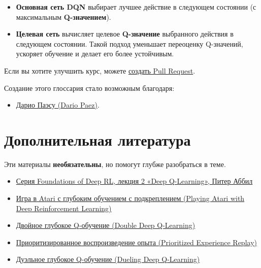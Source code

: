 \documentclass[11pt,a4paper]{article}
\begin{document}
\begin{itemize}
\begin{itemize}
    \begin{itemize}
    \tightlist
    \item
\textbf{Основная сеть DQN} выбирает лучшее действие в следующем состоянии (с максимальным \textbf{Q-значением}).
    \item
\textbf{Целевая сеть} вычисляет целевое \textbf{Q-значение} выбранного действия в следующем состоянии. Такой подход уменьшает переоценку Q-значений, ускоряет обучение и делает его более устойчивым.
    \end{itemize}
  \end{itemize}
\end{itemize}

Если вы хотите улучшить курс, можете \href{https://github.com/huggingface/deep-rl-class/pulls}{создать Pull Request}.

Создание этого глоссария стало возможным благодаря:

\begin{itemize}
\tightlist
\item
\href{https://github.com/dario248}{Дарио Паэсу (Dario Paez)}.
\end{itemize}

\section{Дополнительная литература}\label{additional-readings}

Эти материалы \textbf{необязательны}, но помогут глубже разобраться в теме.

\begin{itemize}
\tightlist
\item
\href{https://youtu.be/Psrhxy88zww}{Серия Foundations of Deep RL, лекция 2 «Deep Q-Learning», Питер Аббил}
\item
\href{https://arxiv.org/abs/1312.5602}{Игра в Atari с глубоким обучением с подкреплением (Playing Atari with Deep Reinforcement Learning)}
\item
\href{https://papers.nips.cc/paper/2010/hash/091d584fced301b442654dd8c23b3fc9-Abstract.html}{Двойное глубокое Q-обучение (Double Deep Q-Learning)}
\item
\href{https://arxiv.org/abs/1511.05952}{Приоритизированное воспроизведение опыта (Prioritized Experience Replay)}
\item
\href{https://arxiv.org/abs/1511.06581}{Дуэльное глубокое Q-обучение (Dueling Deep Q-Learning)}
\end{itemize}
\end{document}
